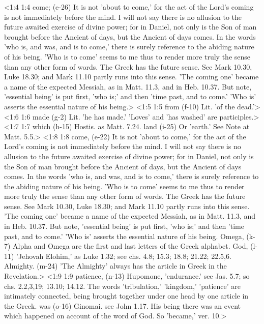 <1:4 1:4  come; (e-26)  It is not 'about to come,' for the act of the Lord's coming  is not immediately before the mind. I will not say there is no  allusion to the future awaited exercise of divine power; for in  Daniel, not only is the Son of man brought before the Ancient  of days, but the Ancient of days comes. In the words 'who is,  and was, and is to come,' there is surely reference to the  abiding nature of his being. 'Who is to come' seems to me thus  to render more truly the sense than any other form of words.  The Greek has the future sense. See Mark 10.30, Luke 18.30; and  Mark 11.10 partly runs into this sense. 'The coming one' became  a name of the expected Messiah, as in Matt. 11.3, and in Heb.  10.37. But note, 'essential being' is put first, 'who is;' and  then 'time past, and to come.' 'Who is' asserts the essential  nature of his being.>
<1:5 1:5  from (f-10)  Lit. 'of the dead.'>
<1:6 1:6  made (g-2)  Lit. 'he has made.' 'Loves' and 'has washed' are participles.>
<1:7 1:7  which (h-15)  Hostis. as Matt. 7.24.
  land (i-25)  Or 'earth.' See Note at Matt. 5.5.>
<1:8 1:8  come, (e-22)  It is not 'about to come,' for the act of the Lord's coming  is not immediately before the mind. I will not say there is no  allusion to the future awaited exercise of divine power; for in  Daniel, not only is the Son of man brought before the Ancient  of days, but the Ancient of days comes. In the words 'who is,  and was, and is to come,' there is surely reference to the  abiding nature of his being. 'Who is to come' seems to me thus  to render more truly the sense than any other form of words.  The Greek has the future sense. See Mark 10.30, Luke 18.30; and  Mark 11.10 partly runs into this sense. 'The coming one' became  a name of the expected Messiah, as in Matt. 11.3, and in Heb.  10.37. But note, 'essential being' is put first, 'who is;' and  then 'time past, and to come.' 'Who is' asserts the essential  nature of his being.
  Omega, (k-7)  Alpha and Omega are the first and last letters of the Greek  alphabet.
  God, (l-11)  'Jehovah Elohim,' as Luke 1.32; see chs. 4.8; 15.3; 18.8; 21.22; 22.5,6.
  Almighty. (m-24)  'The Almighty' always has the article in Greek in the  Revelation.>
<1:9 1:9  patience, (n-13)  Hupomone, 'endurance.' see Jas. 5.7; so chs. 2.2,3,19;  13.10; 14.12. The words 'tribulation,' 'kingdom,' 'patience'  are intimately connected, being brought together under one head  by one article in the Greek.
  was (o-16)  Ginomai. see John 1.17. His being there was an event which  happened on account of the word of God. So 'became,' ver. 10.>
